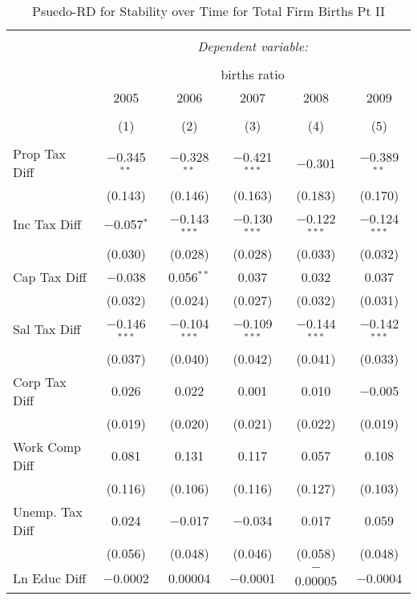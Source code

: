 
\begin{table}[!htbp] \centering 
  \caption{Psuedo-RD for Stability over Time for  Total Firm Births Pt II} 
  \label{--year} 
\small 
\begin{tabular}{@{\extracolsep{5pt}}lccccc} 
\\[-1.8ex]\hline 
\hline \\[-1.8ex] 
 & \multicolumn{5}{c}{\textit{Dependent variable:}} \\ 
\cline{2-6} 
\\[-1.8ex] & \multicolumn{5}{c}{births ratio} \\ 
 & 2005 & 2006 & 2007 & 2008 & 2009 \\ 
\\[-1.8ex] & (1) & (2) & (3) & (4) & (5)\\ 
\hline \\[-1.8ex] 
 Prop Tax Diff & $-$0.345$^{**}$ & $-$0.328$^{**}$ & $-$0.421$^{***}$ & $-$0.301 & $-$0.389$^{**}$ \\ 
  & (0.143) & (0.146) & (0.163) & (0.183) & (0.170) \\ 
  Inc Tax Diff & $-$0.057$^{*}$ & $-$0.143$^{***}$ & $-$0.130$^{***}$ & $-$0.122$^{***}$ & $-$0.124$^{***}$ \\ 
  & (0.030) & (0.028) & (0.028) & (0.033) & (0.032) \\ 
  Cap Tax Diff & $-$0.038 & 0.056$^{**}$ & 0.037 & 0.032 & 0.037 \\ 
  & (0.032) & (0.024) & (0.027) & (0.032) & (0.031) \\ 
  Sal Tax Diff & $-$0.146$^{***}$ & $-$0.104$^{***}$ & $-$0.109$^{***}$ & $-$0.144$^{***}$ & $-$0.142$^{***}$ \\ 
  & (0.037) & (0.040) & (0.042) & (0.041) & (0.033) \\ 
  Corp Tax Diff & 0.026 & 0.022 & 0.001 & 0.010 & $-$0.005 \\ 
  & (0.019) & (0.020) & (0.021) & (0.022) & (0.019) \\ 
  Work Comp Diff & 0.081 & 0.131 & 0.117 & 0.057 & 0.108 \\ 
  & (0.116) & (0.106) & (0.116) & (0.127) & (0.103) \\ 
  Unemp. Tax Diff & 0.024 & $-$0.017 & $-$0.034 & 0.017 & 0.059 \\ 
  & (0.056) & (0.048) & (0.046) & (0.058) & (0.048) \\ 
  Ln Educ Diff & $-$0.0002 & 0.00004 & $-$0.0001 & $-$0.00005 & $-$0.0004 \\ 

\end{tabular}
\end{table}
